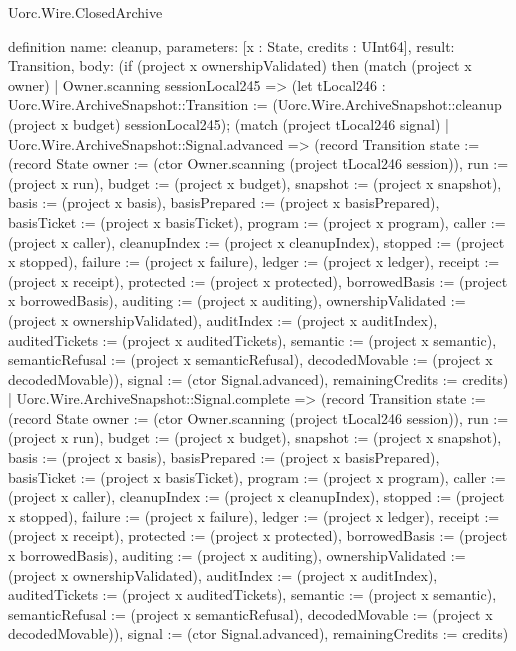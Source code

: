 \begin{lexlean}{Uorc.Wire.ClosedArchive}
\begin{semanticmodule}
definition{
  name: cleanup,
  parameters: [x : State, credits : UInt64],
  result: Transition,
  body: (if (project x ownershipValidated) then (match (project x owner)
    | Owner.scanning sessionLocal245 => (let tLocal246 : Uorc.Wire.ArchiveSnapshot::Transition := (Uorc.Wire.ArchiveSnapshot::cleanup (project x budget) sessionLocal245); (match (project tLocal246 signal)
      | Uorc.Wire.ArchiveSnapshot::Signal.advanced => (record Transition {state := (record State {owner := (ctor Owner.scanning (project tLocal246 session)), run := (project x run), budget := (project x budget), snapshot := (project x snapshot), basis := (project x basis), basisPrepared := (project x basisPrepared), basisTicket := (project x basisTicket), program := (project x program), caller := (project x caller), cleanupIndex := (project x cleanupIndex), stopped := (project x stopped), failure := (project x failure), ledger := (project x ledger), receipt := (project x receipt), protected := (project x protected), borrowedBasis := (project x borrowedBasis), auditing := (project x auditing), ownershipValidated := (project x ownershipValidated), auditIndex := (project x auditIndex), auditedTickets := (project x auditedTickets), semantic := (project x semantic), semanticRefusal := (project x semanticRefusal), decodedMovable := (project x decodedMovable)}), signal := (ctor Signal.advanced), remainingCredits := credits})
      | Uorc.Wire.ArchiveSnapshot::Signal.complete => (record Transition {state := (record State {owner := (ctor Owner.scanning (project tLocal246 session)), run := (project x run), budget := (project x budget), snapshot := (project x snapshot), basis := (project x basis), basisPrepared := (project x basisPrepared), basisTicket := (project x basisTicket), program := (project x program), caller := (project x caller), cleanupIndex := (project x cleanupIndex), stopped := (project x stopped), failure := (project x failure), ledger := (project x ledger), receipt := (project x receipt), protected := (project x protected), borrowedBasis := (project x borrowedBasis), auditing := (project x auditing), ownershipValidated := (project x ownershipValidated), auditIndex := (project x auditIndex), auditedTickets := (project x auditedTickets), semantic := (project x semantic), semanticRefusal := (project x semanticRefusal), decodedMovable := (project x decodedMovable)}), signal := (ctor Signal.advanced), remainingCredits := credits})
}
\end{semanticmodule}
\end{lexlean}
